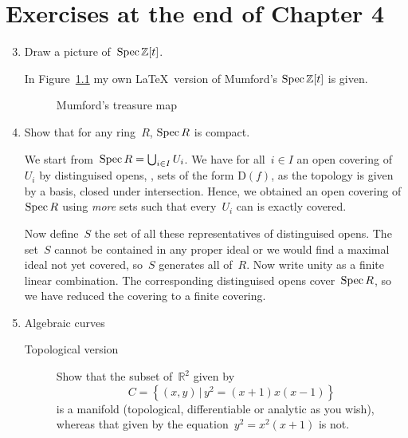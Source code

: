 \documentclass[a4paper,11pt,oneside,openany,article]{memoir}
\begin{document}
\chapter{Exercises at the end of Chapter 4}
\begin{enumerate}
  \setcounter{enumi}{2}
  \item Draw a picture of~$\operatorname{Spec}\mathbb{Z}[t]$.

    \begin{solution}
      In Figure~\ref{figure:treasure} my own \LaTeX\ version of Mumford's $\operatorname{Spec}\mathbb{Z}[t]$ is given.

      \begin{figure}[p]
        \centering
        
        \caption{Mumford's treasure map}
        \label{figure:treasure}
      \end{figure}
    \end{solution}

  \item Show that for any ring~$R$, $\operatorname{Spec} R$ is compact.

    \begin{solution}
      We start from~$\operatorname{Spec} R=\bigcup_{i\in I}U_i$. We have for all~$i\in I$ an open covering of~$U_i$ by distinguised opens, \ie, sets of the form $\mathrm{D}(f)$, as the topology is given by a basis, closed under intersection. Hence, we obtained an open covering of~$\operatorname{Spec} R$ using \emph{more} sets such that every~$U_i$ can is exactly covered.

      Now define~$S$ the set of all these representatives of distinguised opens. The set~$S$ cannot be contained in any proper ideal or we would find a maximal ideal not yet covered, so~$S$ generates all of~$R$. Now write unity as a finite linear combination. The corresponding distinguised opens cover~$\operatorname{Spec} R$, so we have reduced the covering to a finite covering.
    \end{solution}

  \setcounter{enumi}{8}
\item Algebraic curves
  \begin{description}
    \item[Topological version] Show that the subset of~$\mathbb{R}^2$ given by
      \begin{equation}
        C=\left\{ (x,y)\,|\,y^2=(x+1)x(x-1) \right\}
      \end{equation}
      is a manifold (topological, differentiable or analytic as you wish), whereas that given by the equation~$y^2=x^2(x+1)$ is not.


\end{description}
\end{enumerate}
\end{document}
